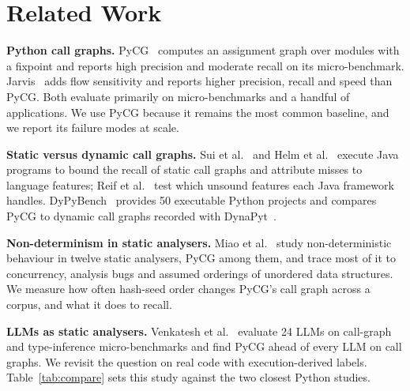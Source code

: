 \documentclass[conference]{IEEEtran}
\begin{document}
\section{Related Work}

\textbf{Python call graphs.} PyCG~\cite{salis2021pycg} computes an assignment graph over
modules with a fixpoint and reports high precision and moderate recall on its micro-benchmark.
Jarvis~\cite{huang2023jarvis} adds flow sensitivity and reports higher precision, recall and speed
than PyCG. Both evaluate primarily on micro-benchmarks and a handful of applications. We use
PyCG because it remains the most common baseline, and we report its failure modes at scale.

\textbf{Static versus dynamic call graphs.} Sui et al.~\cite{sui2020recall} and Helm et
al.~\cite{helm2024totalrecall} execute Java programs to bound the recall of static call graphs
and attribute misses to language features; Reif et al.~\cite{reif2019judge} test which unsound
features each Java framework handles. DyPyBench~\cite{bouzenia2024dypybench} provides 50
executable Python projects and compares PyCG to dynamic call graphs recorded with
DynaPyt~\cite{eghbali2022dynapyt}.

\textbf{Non-determinism in static analysers.} Miao et al.~\cite{miao2025nondet} study
non-deterministic behaviour in twelve static analysers, PyCG among them, and trace most of it to
concurrency, analysis bugs and assumed orderings of unordered data structures. We measure how
often hash-seed order changes PyCG's call graph across a corpus, and what it does to recall.

\textbf{LLMs as static analysers.} Venkatesh et al.~\cite{venkatesh2025llmcg} evaluate 24 LLMs on
call-graph and type-inference micro-benchmarks and find PyCG ahead of every LLM on call graphs.
We revisit the question on real code with execution-derived labels. Table~\ref{tab:compare}
sets this study against the two closest Python studies.
\end{document}
